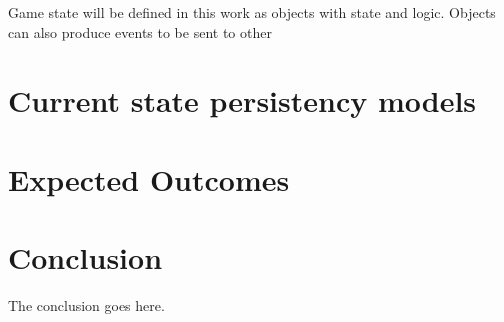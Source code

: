 \documentclass[journal,oneside,a4paper,onecolumn]{IEEEtran}
\begin{document}
Game state will be defined in this work as objects with state and logic. Objects can also produce events to be sent to other

\section{Current state persistency models}

\section{Expected Outcomes}

\section{Conclusion}
The conclusion goes here.




\end{document}
